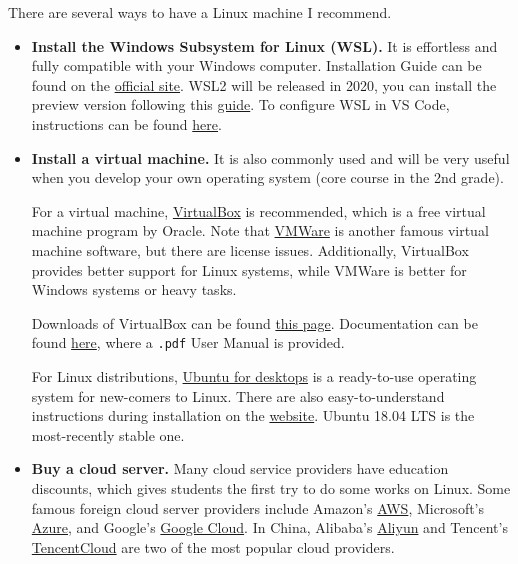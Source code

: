 \documentclass[english]{../TexTemplate/thesis}
\begin{document}
There are several ways to have a Linux machine I recommend.
\begin{itemize}
	\item \textbf{Install the Windows Subsystem for Linux (WSL).}
	It is effortless and fully compatible with your Windows computer.
	Installation Guide can be found on the \href{https://docs.microsoft.com/en-us/windows/wsl/install-win10}{official site}.
	WSL2 will be released in 2020, you can install the preview version following this \href{https://docs.microsoft.com/en-us/windows/wsl/wsl2-install}{guide}.
	To configure WSL in VS Code, instructions can be found \href{https://code.visualstudio.com/docs/remote/wsl}{here}.

	\item \textbf{Install a virtual machine.}
	It is also commonly used and will be very useful when you develop your own operating system (core course in the 2nd grade).

	For a virtual machine, \href{https://www.virtualbox.org/}{VirtualBox} is recommended, which is a free virtual machine program by Oracle. Note that \href{https://www.vmware.com/}{VMWare} is another famous virtual machine software, but there are license issues. Additionally, VirtualBox provides better support for Linux systems, while VMWare is better for Windows systems or heavy tasks.

	Downloads of VirtualBox can be found \href{https://www.virtualbox.org/wiki/Downloads}{this page}. Documentation can be found \href{https://www.virtualbox.org/wiki/Documentation}{here}, where a \verb".pdf" User Manual is provided.

	For Linux distributions, \href{https://www.ubuntu.com/desktop}{Ubuntu for desktops} is a ready-to-use operating system for new-comers to Linux. There are also easy-to-understand instructions during installation on the \href{https://www.ubuntu.com/desktop}{website}. Ubuntu 18.04 LTS is the most-recently stable one.

	\item \textbf{Buy a cloud server.}
	Many cloud service providers have education discounts, which gives students the first try to do some works on Linux.
	Some famous foreign cloud server providers include Amazon's \href{https://aws.amazon.com/cn/}{AWS}, Microsoft's \href{https://azure.microsoft.com/en-us/}{Azure}, and Google's \href{https://cloud.google.com/}{Google Cloud}.
	In China, Alibaba's \href{https://www.aliyun.com/}{Aliyun} and Tencent's \href{https://cloud.tencent.com/}{TencentCloud} are two of the most popular cloud providers.


\end{itemize}
\end{document}
